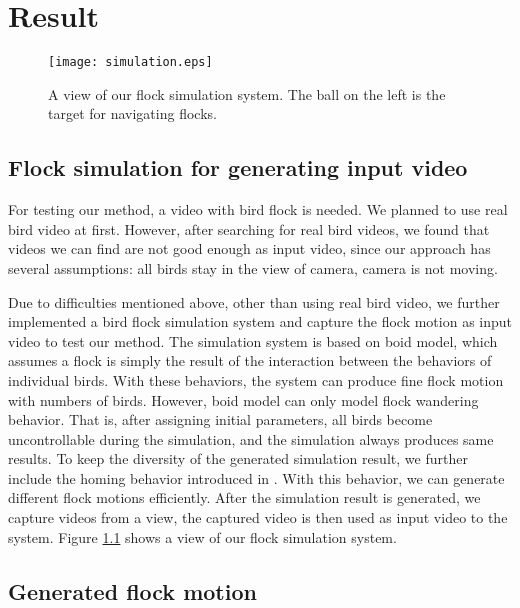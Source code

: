 \chapter{Result}


\begin{figure}[h]
 \begin{center}
  \texttt{[image: simulation.eps]}
 \end{center}
 \caption{A view of our flock simulation system. The ball on the left is the target for navigating flocks.}
 \label{figure:simulation}
\end{figure}


\section{Flock simulation for generating input video}


For testing our method, a video with bird flock is needed. We planned to use real bird video at first. However, after searching for real bird videos, we found that videos we can find are not good enough as input video, since our approach has several assumptions: all birds stay in the view of camera, camera is not moving.


Due to difficulties mentioned above, other than using real bird video, we further implemented a bird flock simulation system and capture the flock motion as input video to test our method. The simulation system is based on boid model, which assumes a flock is simply the result of the interaction between the behaviors of individual birds. With these behaviors, the system can produce fine flock motion with numbers of birds. However, boid model can only model flock wandering behavior. That is, after assigning initial parameters, all birds become uncontrollable during the simulation, and the simulation always produces same results. To keep the diversity of the generated simulation result, we further include the homing behavior introduced in \cite{Shape,OB1}. With this behavior, we can generate different flock motions efficiently. After the simulation result is generated, we capture videos from a view, the captured video is then used as input video to the system. Figure \ref{figure:simulation} shows a view of our flock simulation system.


\section{Generated flock motion}


